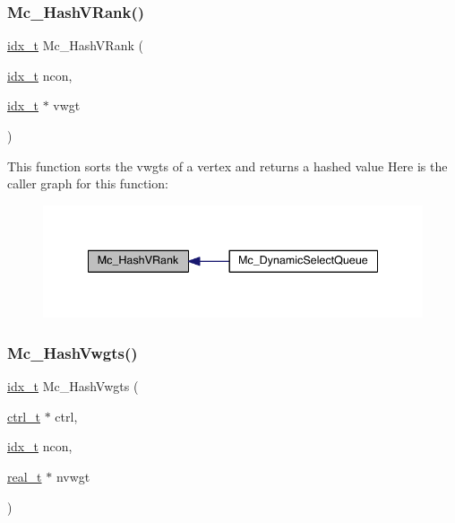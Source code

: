 \subsubsection{\texorpdfstring{Mc\+\_\+\+Hash\+V\+Rank()}{Mc\_HashVRank()}}
{\footnotesize\ttfamily \hyperlink{a00876_aaa5262be3e700770163401acb0150f52}{idx\+\_\+t} Mc\+\_\+\+Hash\+V\+Rank (\begin{DoxyParamCaption}\item[{\hyperlink{a00876_aaa5262be3e700770163401acb0150f52}{idx\+\_\+t}}]{ncon,  }\item[{\hyperlink{a00876_aaa5262be3e700770163401acb0150f52}{idx\+\_\+t} $\ast$}]{vwgt }\end{DoxyParamCaption})}

This function sorts the vwgts of a vertex and returns a hashed value Here is the caller graph for this function\+:\nopagebreak
\begin{figure}[H]
\begin{center}
\leavevmode
\includegraphics[width=338pt]{a00951_a626dd91f1c7a272128a4e825fa72cf18_icgraph}
\end{center}
\end{figure}
\mbox{\label{a00951_ab26a17f837c7eb837a18fc921021e586}} 
\subsubsection{\texorpdfstring{Mc\+\_\+\+Hash\+Vwgts()}{Mc\_HashVwgts()}}
{\footnotesize\ttfamily \hyperlink{a00876_aaa5262be3e700770163401acb0150f52}{idx\+\_\+t} Mc\+\_\+\+Hash\+Vwgts (\begin{DoxyParamCaption}\item[{\hyperlink{a00742}{ctrl\+\_\+t} $\ast$}]{ctrl,  }\item[{\hyperlink{a00876_aaa5262be3e700770163401acb0150f52}{idx\+\_\+t}}]{ncon,  }\item[{\hyperlink{a00876_a1924a4f6907cc3833213aba1f07fcbe9}{real\+\_\+t} $\ast$}]{nvwgt }\end{DoxyParamCaption})}

